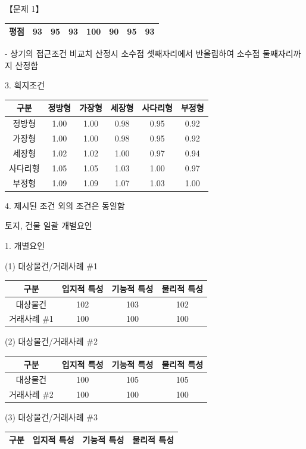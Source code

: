 \begin{longquestion}{【문제 1】}
{\begin{tabular}{|c|c|c|c|c|c|c|c|}
평점 & 93 & 95 & 93 & 100 & 90 & 95 & 93 \\\hline
\end{tabular}\par}
- 상기의 접근조건 비교치 산정시 소수점 셋째자리에서 반올림하여 소수점 둘째자리까지 산정함 \par
3. 획지조건 \par
{\small\centering
\begin{tabular}{|c|c|c|c|c|c|}\hline
구분 & 정방형 & 가장형 & 세장형 & 사다리형 & 부정형 \\\hline
정방형 & 1.00 & 1.00 & 0.98 & 0.95 & 0.92 \\\hline
가장형 & 1.00 & 1.00 & 0.98 & 0.95 & 0.92 \\\hline
세장형 & 1.02 & 1.02 & 1.00 & 0.97 & 0.94 \\\hline
사다리형 & 1.05 & 1.05 & 1.03 & 1.00 & 0.97 \\\hline
부정형 & 1.09 & 1.09 & 1.07 & 1.03 & 1.00 \\\hline
\end{tabular}\par}
4. 제시된 조건 외의 조건은 동일함 \par
\medskip{} 토지, 건물 일괄 개별요인 \par
1. 개별요인 \par
(1) 대상물건/거래사례 \#1 \par
{\small\centering
\begin{tabular}{|c|c|c|c|}\hline
구분 & 입지적 특성 & 기능적 특성 & 물리적 특성 \\\hline
대상물건 & 102 & 103 & 102 \\\hline
거래사례 \#1 & 100 & 100 & 100 \\\hline
\end{tabular}\par}
(2) 대상물건/거래사례 \#2 \par
{\small\centering
\begin{tabular}{|c|c|c|c|}\hline
구분 & 입지적 특성 & 기능적 특성 & 물리적 특성 \\\hline
대상물건 & 100 & 105 & 105 \\\hline
거래사례 \#2 & 100 & 100 & 100 \\\hline
\end{tabular}\par}
(3) 대상물건/거래사례 \#3 \par
{\small\centering
\begin{tabular}{|c|c|c|c|}\hline
구분 & 입지적 특성 & 기능적 특성 & 물리적 특성 \\\hline

\end{tabular}}
\end{longquestion}
